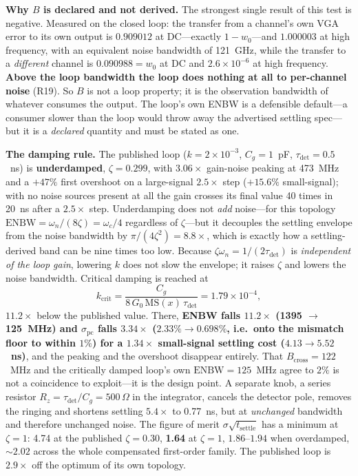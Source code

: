 \documentclass[11pt]{article}
\begin{document}
\textbf{Why $B$ is declared and not derived.} The strongest single result of this test is negative. Measured on the closed loop: the transfer from a channel's own VGA error to its own output is $0.909012$ at DC---exactly $1-w_0$---and $1.000003$ at high frequency, with an equivalent noise bandwidth of 121~GHz, while the transfer to a \textit{different} channel is $0.090988 = w_0$ at DC and $2.6\times10^{-6}$ at high frequency. \textbf{Above the loop bandwidth the loop does nothing at all to per-channel noise} (R19). So $B$ is not a loop property; it is the observation bandwidth of whatever consumes the output. The loop's own ENBW is a defensible default---a consumer slower than the loop would throw away the advertised settling spec---but it is a \textit{declared} quantity and must be stated as one.

\textbf{The damping rule.} The published loop ($k = 2\times10^{-3}$, $C_g = 1$~pF, $\tau_{\mathrm{det}} = 0.5$~ns) is \textbf{underdamped}, $\zeta = 0.299$, with $3.06\times$ gain-noise peaking at 473~MHz and a $+47\%$ first overshoot on a large-signal $2.5\times$ step ($+15.6\%$ small-signal); with no noise sources present at all the gain crosses its final value 40 times in 20~ns after a $2.5\times$ step. Underdamping does not \textit{add} noise---for this topology $\mathrm{ENBW} = \omega_n/(8\zeta) = \omega_c/4$ regardless of $\zeta$---but it decouples the settling envelope from the noise bandwidth by $\pi/(4\zeta^2) = 8.8\times$, which is exactly how a settling-derived band can be nine times too low. Because $\zeta\omega_n = 1/(2\tau_{\mathrm{det}})$ is \textit{independent of the loop gain}, lowering $k$ does not slow the envelope; it raises $\zeta$ and lowers the noise bandwidth. Critical damping is reached at
\[
k_{\mathrm{crit}} = \frac{C_g}{8\,G_0\,\mathrm{MS}(x)\,\tau_{\mathrm{det}}} = 1.79\times10^{-4},
\]
$11.2\times$ below the published value. There, \textbf{ENBW falls $11.2\times$ (1395 $\to$ 125~MHz) and $\sigma_{\mathrm{pc}}$ falls $3.34\times$ ($2.33\% \to 0.698\%$, i.e.\ onto the mismatch floor to within $1\%$) for a $1.34\times$ small-signal settling cost ($4.13 \to 5.52$~ns)}, and the peaking and the overshoot disappear entirely. That $B_{\mathrm{cross}} = 122$~MHz and the critically damped loop's own $\mathrm{ENBW} = 125$~MHz agree to $2\%$ is not a coincidence to exploit---it is the design point. A separate knob, a series resistor $R_z = \tau_{\mathrm{det}}/C_g = 500\,\Omega$ in the integrator, cancels the detector pole, removes the ringing and shortens settling $5.4\times$ to 0.77~ns, but at \textit{unchanged} bandwidth and therefore unchanged noise. The figure of merit $\sigma\sqrt{t_{\mathrm{settle}}}$ has a minimum at $\zeta = 1$: 4.74 at the published $\zeta = 0.30$, \textbf{1.64} at $\zeta=1$, $1.86$--$1.94$ when overdamped, ${\sim}2.02$ across the whole compensated first-order family. The published loop is $2.9\times$ off the optimum of its own topology.
\end{document}
